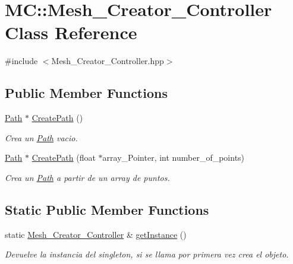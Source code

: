 \hypertarget{class_m_c_1_1_mesh___creator___controller}{}\section{MC\+::Mesh\+\_\+\+Creator\+\_\+\+Controller Class Reference}
\label{class_m_c_1_1_mesh___creator___controller}


{\ttfamily \#include $<$Mesh\+\_\+\+Creator\+\_\+\+Controller.\+hpp$>$}

\subsection*{Public Member Functions}
\begin{DoxyCompactItemize}
\item 
\mbox{\hyperlink{class_m_c_1_1_path}{Path}} $\ast$ \mbox{\hyperlink{class_m_c_1_1_mesh___creator___controller_abbac03a7390bacd9a804c46e64e431ba}{Create\+Path}} ()
\begin{DoxyCompactList}\small\item\em Crea un \mbox{\hyperlink{class_m_c_1_1_path}{Path}} vacio. \end{DoxyCompactList}\item 
\mbox{\hyperlink{class_m_c_1_1_path}{Path}} $\ast$ \mbox{\hyperlink{class_m_c_1_1_mesh___creator___controller_aa3b4c3f287eacdc76b53763c15ae63e3}{Create\+Path}} (float $\ast$array\+\_\+\+Pointer, int number\+\_\+of\+\_\+points)
\begin{DoxyCompactList}\small\item\em Crea un \mbox{\hyperlink{class_m_c_1_1_path}{Path}} a partir de un array de puntos. \end{DoxyCompactList}\end{DoxyCompactItemize}
\subsection*{Static Public Member Functions}
\begin{DoxyCompactItemize}
\item 
static \mbox{\hyperlink{class_m_c_1_1_mesh___creator___controller}{Mesh\+\_\+\+Creator\+\_\+\+Controller}} \& \mbox{\hyperlink{class_m_c_1_1_mesh___creator___controller_af0292e4c19965d62bd9b7b92c1adbbc2}{get\+Instance}} ()
\begin{DoxyCompactList}\small\item\em Devuelve la instancia del singleton, si se llama por primera vez crea el objeto. \end{DoxyCompactList}\end{DoxyCompactItemize}
